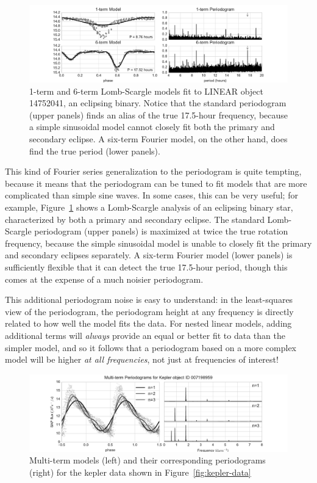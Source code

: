 \documentclass[preprint]{aastex}
\newcommand{\fig}[1]{Figure~\ref{fig:#1}}
\newcommand{\figlabel}[1]{\label{fig:#1}}
\begin{document}
\begin{figure}[ht]
  \centering
  \includegraphics[width=\textwidth]{fig23_binary_multiterm}
  \caption{1-term and 6-term Lomb-Scargle models fit to LINEAR object
    14752041, an eclipsing binary. Notice that the standard periodogram
    (upper panels) finds an alias of the true 17.5-hour frequency,
    because a simple sinusoidal model cannot closely fit both the primary
    and secondary eclipse. A six-term Fourier model, on
    the other hand, does find the true period (lower panels).
    \figlabel{binary-multiterm}}
\end{figure}

This kind of Fourier series generalization to the periodogram is quite
tempting, because it means that the periodogram can be tuned to fit models
that are more complicated than simple sine waves.
In some cases, this can be very useful; for example, \fig{binary-multiterm}
shows a Lomb-Scargle analysis of an eclipsing binary star, characterized by
both a primary and secondary eclipse.
The standard Lomb-Scargle periodogram (upper panels) is maximized at twice the true rotation
frequency, because the simple sinusoidal model is unable to closely fit the
primary and secondary eclipses separately.
A six-term Fourier model (lower panels) is sufficiently flexible that it can
detect the true 17.5-hour period, though this comes at the expense of a much
noisier periodogram.

This additional periodogram noise is easy to understand: in the least-squares
view of the periodogram, the periodogram height at any frequency is directly
related to how well the model fits the data.
For nested linear models, adding additional terms will {\it always} provide an
equal or better fit to data than the simpler model, and so it follows that
a periodogram based on a more complex model will be higher
{\it at all frequencies}, not just at frequencies of interest!

\begin{figure}[ht]
  \centering
  \includegraphics[width=\textwidth]{fig21_kepler_multiterm}
  \caption{Multi-term models (left) and their corresponding periodograms (right)
    for the kepler data shown in \fig{kepler-data}
    \figlabel{kepler-multiterm}}
\end{figure}
\end{document}
